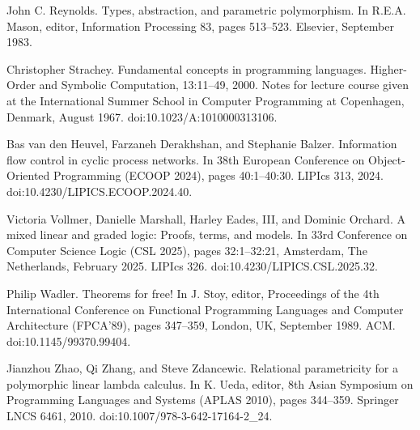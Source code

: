 \par\noindent  [42]  John C. Reynolds.  Types, abstraction, and parametric polymorphism.  In R.E.A. Mason, editor, Information Processing 83, pages 513–523. Elsevier, September 1983.  
 
\par\noindent  [43]  Christopher Strachey.  Fundamental concepts in programming languages.  Higher-Order and Symbolic Computation, 13:11–49, 2000.  Notes for lecture course given at the International Summer School in Computer Programming at Copenhagen, Denmark, August 1967.  doi:10.1023/A:1010000313106.  
 
\par\noindent  [44]  Bas van den Heuvel, Farzaneh Derakhshan, and Stephanie Balzer.  Information flow control in cyclic process networks.  In 38th European Conference on Object-Oriented Programming (ECOOP 2024), pages 40:1–40:30. LIPIcs 313, 2024.  doi:10.4230/LIPICS.ECOOP.2024.40.  
 
\par\noindent  [45]  Victoria Vollmer, Danielle Marshall, Harley Eades, III, and Dominic Orchard.  A mixed linear and graded logic: Proofs, terms, and models.  In 33rd Conference on Computer Science Logic (CSL 2025), pages 32:1–32:21, Amsterdam, The Netherlands, February 2025. LIPIcs 326.  doi:10.4230/LIPICS.CSL.2025.32.  
 
\par\noindent  [46]  Philip Wadler.  Theorems for free!  In J. Stoy, editor, Proceedings of the 4th International Conference on Functional Programming Languages and Computer Architecture (FPCA’89), pages 347–359, London, UK, September 1989. ACM.  doi:10.1145/99370.99404.  
 
\par\noindent  [47]  Jianzhou Zhao, Qi Zhang, and Steve Zdancewic.  Relational parametricity for a polymorphic linear lambda calculus.  In K. Ueda, editor, 8th Asian Symposium on Programming Languages and Systems (APLAS 2010), pages 344–359. Springer LNCS 6461, 2010.  doi:10.1007/978-3-642-17164-2\_24.  
  
